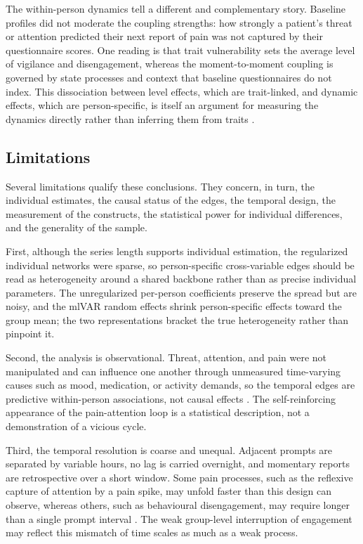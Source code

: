 \documentclass[11pt,a4paper]{article}
\begin{document}
The within-person dynamics tell a different and complementary story. Baseline profiles did not
moderate the coupling strengths: how strongly a patient's threat or attention predicted their next
report of pain was not captured by their questionnaire scores. One reading is that trait
vulnerability sets the average level of vigilance and disengagement, whereas the moment-to-moment
coupling is governed by state processes and context that baseline questionnaires do not index.
This dissociation between level effects, which are trait-linked, and dynamic effects, which are
person-specific, is itself an argument for measuring the dynamics directly rather than inferring
them from traits \citep{wright2020personalized}.

\subsection{Limitations}
Several limitations qualify these conclusions. They concern, in turn, the individual estimates,
the causal status of the edges, the temporal design, the measurement of the constructs, the
statistical power for individual differences, and the generality of the sample.

First, although the series length supports individual estimation, the regularized individual
networks were sparse, so person-specific cross-variable edges should be read as heterogeneity
around a shared backbone rather than as precise individual parameters. The unregularized
per-person coefficients preserve the spread but are noisy, and the mlVAR random effects shrink
person-specific effects toward the group mean; the two representations bracket the true
heterogeneity rather than pinpoint it.

Second, the analysis is observational. Threat, attention, and pain were not manipulated and can
influence one another through unmeasured time-varying causes such as mood, medication, or activity
demands, so the temporal edges are predictive within-person associations, not causal effects
\citep{rohrer2018thinking}. The self-reinforcing appearance of the pain-attention loop is a
statistical description, not a demonstration of a vicious cycle.

Third, the temporal resolution is coarse and unequal. Adjacent prompts are separated by variable
hours, no lag is carried overnight, and momentary reports are retrospective over a short window.
Some pain processes, such as the reflexive capture of attention by a pain spike, may unfold faster
than this design can observe, whereas others, such as behavioural disengagement, may require longer
than a single prompt interval \citep{hamaker2017no}. The weak group-level interruption of
engagement may reflect this mismatch of time scales as much as a weak process.
\end{document}
